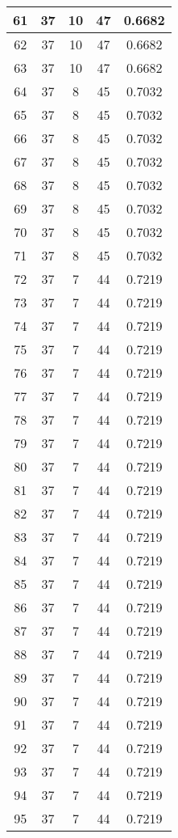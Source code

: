\documentclass[letterpaper, 12pt]{article}
\begin{document}
\begin{longtable}{|c|c|c|c|c|}
\hline
61 & 37 & 10 & 47 & 0.6682 \\
\hline
62 & 37 & 10 & 47 & 0.6682 \\
\hline
63 & 37 & 10 & 47 & 0.6682 \\
\hline
64 & 37 & 8 & 45 & 0.7032 \\
\hline
65 & 37 & 8 & 45 & 0.7032 \\
\hline
66 & 37 & 8 & 45 & 0.7032 \\
\hline
67 & 37 & 8 & 45 & 0.7032 \\
\hline
68 & 37 & 8 & 45 & 0.7032 \\
\hline
69 & 37 & 8 & 45 & 0.7032 \\
\hline
70 & 37 & 8 & 45 & 0.7032 \\
\hline
71 & 37 & 8 & 45 & 0.7032 \\
\hline
72 & 37 & 7 & 44 & 0.7219 \\
\hline
73 & 37 & 7 & 44 & 0.7219 \\
\hline
74 & 37 & 7 & 44 & 0.7219 \\
\hline
75 & 37 & 7 & 44 & 0.7219 \\
\hline
76 & 37 & 7 & 44 & 0.7219 \\
\hline
77 & 37 & 7 & 44 & 0.7219 \\
\hline
78 & 37 & 7 & 44 & 0.7219 \\
\hline
79 & 37 & 7 & 44 & 0.7219 \\
\hline
80 & 37 & 7 & 44 & 0.7219 \\
\hline
81 & 37 & 7 & 44 & 0.7219 \\
\hline
82 & 37 & 7 & 44 & 0.7219 \\
\hline
83 & 37 & 7 & 44 & 0.7219 \\
\hline
84 & 37 & 7 & 44 & 0.7219 \\
\hline
85 & 37 & 7 & 44 & 0.7219 \\
\hline
86 & 37 & 7 & 44 & 0.7219 \\
\hline
87 & 37 & 7 & 44 & 0.7219 \\
\hline
88 & 37 & 7 & 44 & 0.7219 \\
\hline
89 & 37 & 7 & 44 & 0.7219 \\
\hline
90 & 37 & 7 & 44 & 0.7219 \\
\hline
91 & 37 & 7 & 44 & 0.7219 \\
\hline
92 & 37 & 7 & 44 & 0.7219 \\
\hline
93 & 37 & 7 & 44 & 0.7219 \\
\hline
94 & 37 & 7 & 44 & 0.7219 \\
\hline
95 & 37 & 7 & 44 & 0.7219 \\

\end{longtable}
\end{document}
